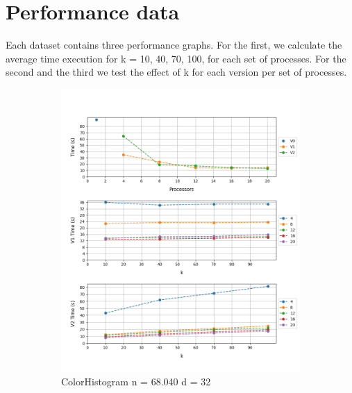 \documentclass[12pt, a4paper]{article}
\begin{document}
\section{Performance data}

Each dataset contains three performance graphs. For the first, we calculate the average time execution for k = 10, 40, 70, 100, for each set of processes. For the second and the third we test the effect of k for each version per set of processes. 
\begin{figure}[h!]
     \begin{subfigure}[b]{0.33\textwidth}
         \centering
         \includegraphics[height=.20\textheight, width=\textwidth, keepaspectratio]{assets/corel/histo.png}
    \caption{ColorHistogram n = 68.040 d = 32}
     \end{subfigure}
     \hfill
     \begin{subfigure}[b]{0.33\textwidth}
         \centering

\end{subfigure}
\end{figure}
\end{document}
